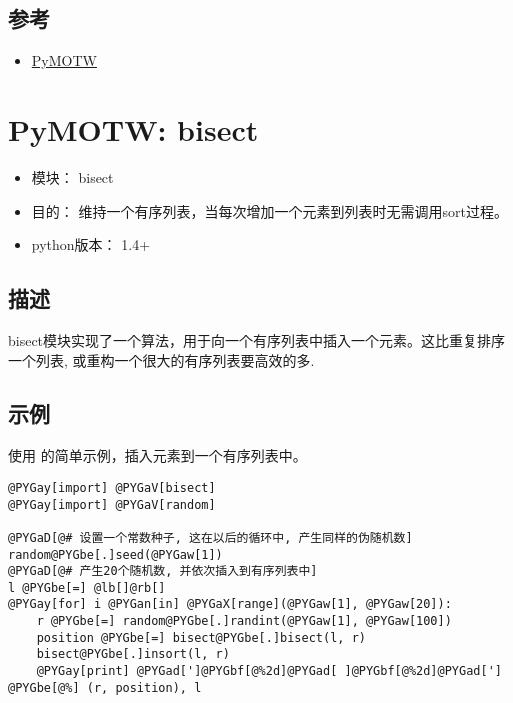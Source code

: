 \documentclass[a4paper,10pt,english]{manual}
\begin{document}
\subsection{参考}
\begin{itemize}
\item {} 
\href{http://http://tc-nsop-test2.tc.baidu.com:3129/documents}{PyMOTW}

\end{itemize}

\resetcurrentobjects


\section{PyMOTW: bisect}
\begin{itemize}
\item {} 
模块： bisect

\item {} 
目的： 维持一个有序列表，当每次增加一个元素到列表时无需调用sort过程。

\item {} 
python版本： 1.4+

\end{itemize}


\subsection{描述}

bisect模块实现了一个算法，用于向一个有序列表中插入一个元素。这比重复排序一个列表, 或重构一个很大的有序列表要高效的多.


\subsection{示例}

使用  的简单示例，插入元素到一个有序列表中。

\begin{Verbatim}[commandchars=@\[\]]
@PYGay[import] @PYGaV[bisect]
@PYGay[import] @PYGaV[random]

@PYGaD[@# 设置一个常数种子, 这在以后的循环中, 产生同样的伪随机数]
random@PYGbe[.]seed(@PYGaw[1])
@PYGaD[@# 产生20个随机数, 并依次插入到有序列表中]
l @PYGbe[=] @lb[]@rb[]
@PYGay[for] i @PYGan[in] @PYGaX[range](@PYGaw[1], @PYGaw[20]):
    r @PYGbe[=] random@PYGbe[.]randint(@PYGaw[1], @PYGaw[100])
    position @PYGbe[=] bisect@PYGbe[.]bisect(l, r)
    bisect@PYGbe[.]insort(l, r)
    @PYGay[print] @PYGad[']@PYGbf[@%2d]@PYGad[ ]@PYGbf[@%2d]@PYGad['] @PYGbe[@%] (r, position), l
\end{Verbatim}
\end{document}
